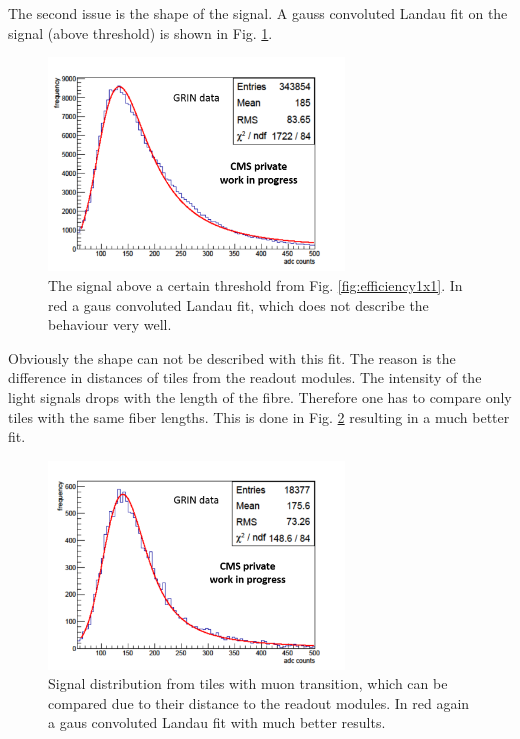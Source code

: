 			The second issue is the shape of the signal.
			A gauss convoluted Landau fit on the signal (above threshold) is shown in Fig. \ref{fig:langaus_bad}.
			\begin{figure}[htbp]
				\centering
				\includegraphics[width=0.70\textwidth]{Figures/erdogan/langaus_bad.png}
				\caption{The signal above a certain threshold from Fig. \ref{fig:efficiency1x1}. In red a gaus convoluted Landau fit, which does not describe the behaviour very well.}
				\label{fig:langaus_bad}
			\end{figure}
			Obviously the shape can not be described with this fit.
			The reason is the difference in distances of tiles from the readout modules.
			The intensity of the light signals drops with the length of the fibre.
			Therefore one has to compare only tiles with the same fiber lengths.
			This is done in Fig. \ref{fig:langaus_good} resulting in a much better fit.
			\begin{figure}[htbp]
				\centering
				\includegraphics[width=0.70\textwidth]{Figures/erdogan/langaus_good.png}
				\caption{Signal distribution from tiles with muon transition, which can be compared due to their distance to the readout modules. In red again a gaus convoluted Landau fit with much better
				results.}
				\label{fig:langaus_good}
			\end{figure}
